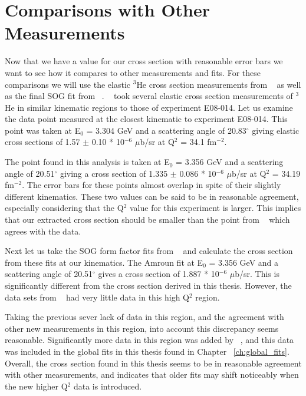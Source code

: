 \section{Comparisons with Other Measurements}
\label{sec:comparisons}

Now that we have a value for our cross section with reasonable error bars we want to see how it compares to other measurements and fits. For these comparisons we will use the elastic $^3$He cross section measurements from ~\cite{Article:Alex} as well as the final SOG fit from ~\cite{Article:Amroun}. ~\cite{Article:Alex} took several elastic cross section measurements of $^3$He in similar kinematic regions to those of experiment E08-014. Let us examine the data point measured at the closest kinematic to experiment E08-014. This point was taken at E$_0$ = 3.304 GeV and a scattering angle of 20.83$^{\circ}$ giving elastic cross sections of 1.57 $\pm$ 0.10 * 10$^{-6}$ $\mu$b/sr at Q$^2$ = 34.1 fm$^{-2}$. 

The point found in this analysis is taken at E$_0$ = 3.356 GeV and a scattering angle of 20.51$^{\circ}$ giving a cross section of 1.335 $\pm$ 0.086 * 10$^{-6}$ $\mu$b/sr at Q$^2$ = 34.19 fm$^{-2}$. The error bars for these points almost overlap in spite of their slightly different kinematics. These two values can be said to be in reasonable agreement, especially considering that the Q$^2$ value for this experiment is larger. This implies that our extracted cross section should be smaller than the point from ~\cite{Article:Alex} which agrees with the data.

Next let us take the SOG form factor fits from ~\cite{Article:Amroun} and calculate the cross section from these fits at our kinematics. The Amroun fit at E$_0$ = 3.356 GeV and a scattering angle of 20.51$^{\circ}$ gives a cross section of  1.887 * 10$^{-6}$ $\mu$b/sr. This is significantly different from the cross section derived in this thesis. However, the data sets from ~\cite{Article:Amroun} had very little data in this high Q$^2$ region. 

Taking the previous sever lack of data in this region, and the agreement with other new measurements in this region, into account this discrepancy seems reasonable. Significantly more data in this region was added by ~\cite{Article:Alex}, and this data was included in the global fits in this thesis found in Chapter ~\ref{ch:global_fits}. Overall, the cross section found in this thesis seems to be in reasonable agreement with other measurements, and indicates that older fits may shift noticeably when the new higher Q$^2$ data is introduced.